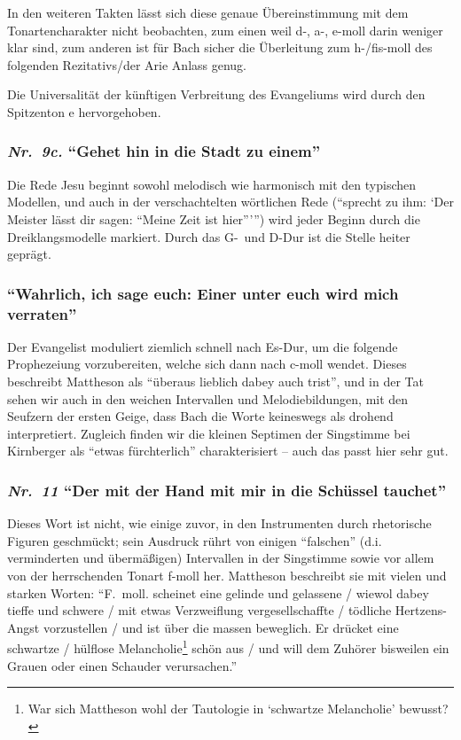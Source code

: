 \documentclass[a4paper,11pt,twoside]{scrartcl}
\newcommand{\Nr}[1]{\textmd{\textit{Nr.~#1}}}
\begin{document}
In den weiteren Takten lässt sich diese genaue Übereinstimmung
mit dem Tonartencharakter nicht beobachten, zum einen weil d-, a-,
e-moll darin weniger klar sind, zum anderen ist für Bach sicher
die Überleitung zum h-/fis-moll des folgenden Rezitativs/der Arie
Anlass genug.

Die Universalität der künftigen Verbreitung des Evangeliums
wird durch den Spitzenton e hervorgehoben.

\subsubsection*{\Nr{9c.} \enquote{Gehet hin in die Stadt zu einem}}
Die Rede Jesu beginnt sowohl melodisch wie harmonisch mit
den typischen Modellen, und auch in der verschachtelten wörtlichen
Rede (\enquote{sprecht zu ihm: \enquote{Der Meister lässt dir sagen:
\enquote{Meine Zeit ist hier}}}) wird jeder Beginn durch die
Dreiklangsmodelle markiert.  Durch das G-~und D-Dur ist die Stelle
heiter geprägt.

\subsubsection*{
\enquote{Wahrlich, ich sage euch: Einer unter euch wird mich verraten}
}
Der Evangelist moduliert ziemlich schnell nach Es-Dur, um die
folgende Prophezeiung vorzubereiten, welche sich dann nach c-moll
wendet.  Dieses beschreibt Mattheson als \enquote{überaus lieblich
dabey auch trist}, und in der Tat sehen wir auch in den weichen
Intervallen und Melodiebildungen, mit den Seufzern der ersten Geige,
dass Bach die Worte keineswegs als drohend interpretiert. Zugleich
finden wir die kleinen Septimen der Singstimme bei Kirnberger\cite[S.~104]{kirnberger}
als \enquote{etwas fürchterlich} charakterisiert – auch das passt
hier sehr gut.

\subsubsection*{\Nr{11} \enquote{Der mit der Hand mit mir in die Schüssel tauchet}}
Dieses Wort ist nicht, wie einige zuvor, in den Instrumenten durch
rhetorische Figuren geschmückt; sein Ausdruck rührt von einigen
\enquote{falschen} (d.i. verminderten und übermäßigen) Intervallen
in der Singstimme sowie vor allem von der herrschenden Tonart f-moll
her.  Mattheson beschreibt sie mit vielen und starken Worten:
\enquote{F.~moll. scheinet eine gelinde und gelassene / wiewol dabey
tieffe und schwere / mit etwas Verzweiflung vergesellschaffte /
tödliche Hertzens-Angst vorzustellen / und ist über die massen
beweglich.  Er drücket eine schwartze / hülflose Melancholie\footnote{War
sich Mattheson wohl der Tautologie in \enquote{schwartze Melancholie}
bewusst?} schön aus / und will dem Zuhörer bisweilen ein Grauen oder
einen Schauder verursachen.}
\end{document}
